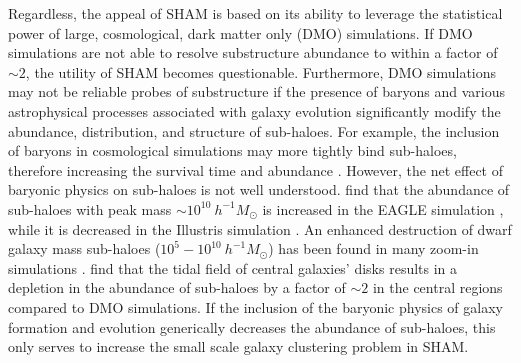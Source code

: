 \documentclass[a4paper,fleqn,usenatbib]{mnras}
\begin{document}
Regardless, the appeal of SHAM is based on its ability to leverage the statistical power of large, cosmological, dark matter only (DMO) simulations.  If DMO simulations are not able to resolve substructure abundance to within a factor of $\sim 2$, the utility of SHAM becomes questionable.  Furthermore, DMO simulations may not be reliable probes of substructure if the presence of baryons and various astrophysical processes associated with galaxy evolution significantly modify the abundance, distribution, and structure of sub-haloes.  For example, the inclusion of baryons in cosmological simulations may more tightly bind sub-haloes, therefore increasing the survival time and abundance  \citep{Fiacconi:2016ba}.  However, the net effect of baryonic physics on sub-haloes is not well understood.  \citet{Despali:2016uv} find that the abundance of sub-haloes with peak mass $\sim 10^{10}~h^{-1}M_{\odot}$ is increased in the EAGLE simulation \citep{Schaye:2015gk}, while it is decreased in the Illustris simulation \citep{Vogelsberger:2014gw}.  An enhanced destruction of dwarf galaxy mass sub-haloes ($10^{5} -10^{10} ~h^{-1}M_{\odot}$) has been found in many zoom-in simulations \citep{Read:2006da, Read:2006hw, Brooks:2014jv, Wetzel:2016iy}.  \citet{GarrisonKimmel:2017tu} find that the tidal field of central galaxies' disks results in a depletion in the abundance of sub-haloes by a factor of $\sim 2$ in the central regions compared to DMO simulations.  If the inclusion of the baryonic physics of galaxy formation and evolution generically decreases the abundance of sub-haloes, this only serves to increase the small scale galaxy clustering problem in SHAM.  
\end{document}
